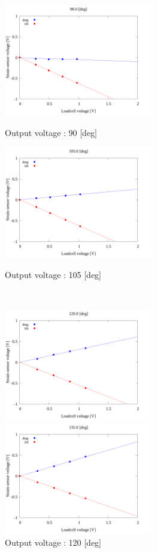     \begin{figure}
      \begin{minipage}[b]{0.45\linewidth}
        \centering
      \includegraphics[width=65mm]{../../02_workspace/result/2-1/plot/04/04_linear_900.png}
      \caption{Output voltage : 90 [deg]}
    \end{minipage}
    \begin{minipage}[b]{0.45\linewidth}
        \centering
        \includegraphics[width=65mm]{../../02_workspace/result/2-1/plot/04/04_linear_1050.png}
        \caption{Output voltage : 105 [deg]}
      \end{minipage}\\
      \begin{minipage}[b]{0.45\linewidth}
        \centering
        \includegraphics[width=65mm]{../../02_workspace/result/2-1/plot/04/04_linear_1200.png}
        \caption{Output voltage : 120 [deg]}
      \end{minipage}
      \begin{minipage}[b]{0.45\linewidth}
        \centering
        \includegraphics[width=65mm]{../../02_workspace/result/2-1/plot/04/04_linear_1350.png}

\end{minipage}
\end{figure}
